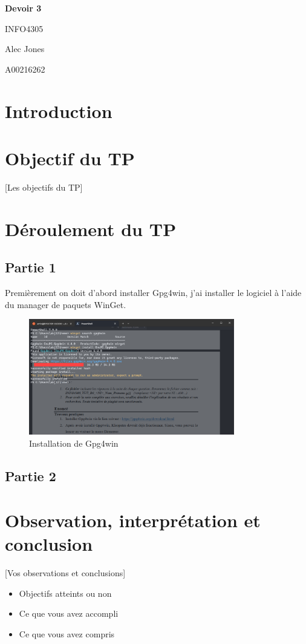 \documentclass[12pt,a4paper]{article}
\begin{document}
\begin{titlepage}
    \begin{center}
        \vspace*{2cm}
        {\huge\bfseries Devoir 3\par}
        {INFO4305\par}
        \vspace{2cm}
        {\Large Alec Jones\par}
        {\large A00216262\par}
        \vfill
    \end{center}
\end{titlepage}

\tableofcontents
\newpage

\section{Introduction}

\section{Objectif du TP}
 [Les objectifs du TP]

\section{Déroulement du TP}
\subsection{Partie 1}
Premièrement on doit d'abord installer Gpg4win, j'ai installer le logiciel à
l'aide du manager de paquets WinGet.

\begin{figure}[h]
    \centering
    \includegraphics[width=0.8\textwidth]{../img/image.png}
    \caption{Installation de Gpg4win}
\end{figure}

\subsection{Partie 2}


\section{Observation, interprétation et conclusion}
 [Vos observations et conclusions]
\begin{itemize}
    \item Objectifs atteints ou non
    \item Ce que vous avez accompli
    \item Ce que vous avez compris
\end{itemize}
\end{document}
